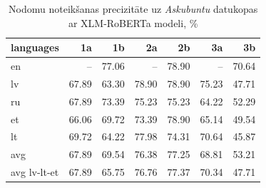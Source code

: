 \begin{table}[htbp]
  \centering
  \caption{Nodomu noteikšanas precizitāte uz \textit{Askubuntu} datukopas ar XLM-RoBERTa modeli, \%}
    \begin{tabular}{lrrrrrr}\toprule
    languages & 1a & 1b & 2a & 2b & 3a & 3b \\\midrule
    en    &   --  & \cellcolor[rgb]{ .498,  .643,  .827}77.06 &  --   & \cellcolor[rgb]{ .353,  .541,  .776}78.90 &   --  & \cellcolor[rgb]{ .988,  .988,  1}70.64 \\
    lv    & \cellcolor[rgb]{ .984,  .922,  .933}67.89 & \cellcolor[rgb]{ .98,  .816,  .827}63.30 & \cellcolor[rgb]{ .353,  .541,  .776}78.90 & \cellcolor[rgb]{ .353,  .541,  .776}78.90 & \cellcolor[rgb]{ .639,  .741,  .878}75.23 & \cellcolor[rgb]{ .973,  .451,  .459}47.71 \\
    ru    & \cellcolor[rgb]{ .984,  .922,  .933}67.89 & \cellcolor[rgb]{ .78,  .843,  .929}73.39 & \cellcolor[rgb]{ .639,  .741,  .878}75.23 & \cellcolor[rgb]{ .639,  .741,  .878}75.23 & \cellcolor[rgb]{ .98,  .835,  .847}64.22 & \cellcolor[rgb]{ .976,  .561,  .569}52.29 \\
    et    & \cellcolor[rgb]{ .984,  .878,  .89}66.06 & \cellcolor[rgb]{ .984,  .965,  .976}69.72 & \cellcolor[rgb]{ .78,  .843,  .929}73.39 & \cellcolor[rgb]{ .353,  .541,  .776}78.90 & \cellcolor[rgb]{ .984,  .859,  .871}65.14 & \cellcolor[rgb]{ .973,  .494,  .502}49.54 \\
    lt    & \cellcolor[rgb]{ .984,  .965,  .976}69.72 & \cellcolor[rgb]{ .98,  .835,  .847}64.22 & \cellcolor[rgb]{ .427,  .592,  .804}77.98 & \cellcolor[rgb]{ .71,  .792,  .902}74.31 & \cellcolor[rgb]{ .988,  .988,  1}70.64 & \cellcolor[rgb]{ .973,  .412,  .42}45.87 \\
    avg   & 67.89 & 69.54 & 76.38 & 77.25 & 68.81 & 53.21 \\
    avg lv-lt-et & 67.89 & 65.75 & 76.76 & 77.37 & 70.34 & 47.71 \\
    \end{tabular}%
  \label{tab:askubuntu-xlm}%
\end{table}%


